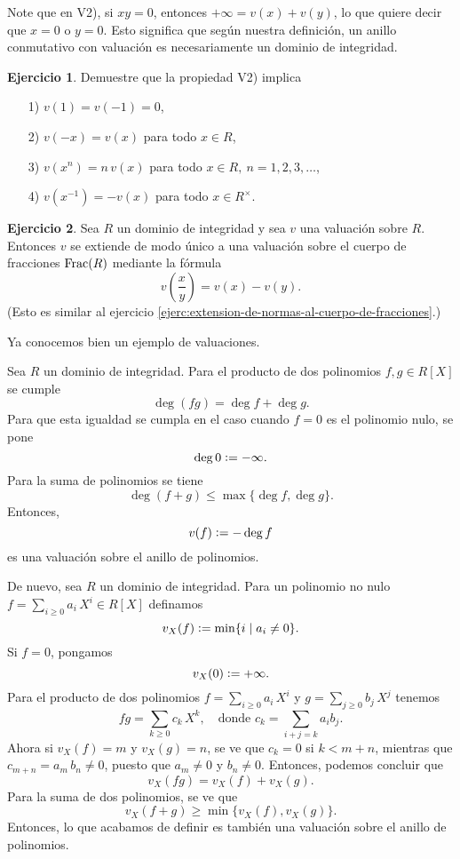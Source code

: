 \documentclass{article}
\numberwithin{equation}{section}
\theoremstyle{definition}
\newtheorem{ejerc}{Ejercicio}
\begin{document}
Note que en V2), si $xy = 0$, entonces $+\infty = v (x) + v (y)$, lo que quiere
decir que $x = 0$ o $y = 0$. Esto significa que según nuestra definición, un
anillo conmutativo con valuación es necesariamente un dominio de integridad.

\begin{ejerc}
  Demuestre que la propiedad V2) implica

  \begin{enumerate}
  \item[1)] $v (1) = v (-1) = 0$,

  \item[2)] $v (-x) = v (x)$ para todo $x\in R$,

  \item[3)] $v (x^n) = n\,v (x)$ para todo $x\in R, ~ n = 1,2,3,\ldots$,

  \item[4)] $v (x^{-1}) = -v(x)$ para todo $x\in R^\times$.
  \end{enumerate}
\end{ejerc}

\begin{ejerc}
  \label{ejerc:extension-de-valuaciones-al-cuerpo-de-fracciones}
  Sea $R$ un dominio de integridad y sea $v$ una valuación sobre $R$. Entonces
  $v$ se extiende de modo único a una valuación sobre el cuerpo de fracciones
  $\operatorname{Frac} (R)$ mediante la fórmula
  $$v \left(\frac{x}{y}\right) = v (x) - v (y).$$
  (Esto es similar al ejercicio
  \ref{ejerc:extension-de-normas-al-cuerpo-de-fracciones}.)
\end{ejerc}

Ya conocemos bien un ejemplo de valuaciones.

\begin{ejemplo}
  \label{ejemplo:valuacion-por-grado}
  Sea $R$ un dominio de integridad. Para el producto de dos polinomios
  $f,g\in R [X]$ se cumple
  $$\deg (fg) = \deg f + \deg g.$$
  Para que esta igualdad se cumpla en el caso cuando $f = 0$ es el polinomio
  nulo, se pone
  $$\deg 0 \mathrel{\mathop:}= -\infty.$$
  Para la suma de polinomios se tiene
  $$\deg (f+g) \le \max \{ \deg f, \deg g \}.$$
  Entonces,
  $$v (f) \mathrel{\mathop:}= -\deg f$$
  es una valuación sobre el anillo de polinomios.
\end{ejemplo}

\begin{ejemplo}
  \label{ejemplo:valuacion-por-X}
  De nuevo, sea $R$ un dominio de integridad. Para un polinomio no nulo
  $f = \sum_{i\ge 0} a_i\,X^i \in R [X]$ definamos
  $$v_X (f) \mathrel{\mathop:}= \min \{ i \mid a_i \ne 0 \}.$$
  Si $f = 0$, pongamos
  $$v_X (0) \mathrel{\mathop:}= +\infty.$$
  Para el producto de dos polinomios $f = \sum_{i\ge 0} a_i\,X^i$
  y $g = \sum_{j\ge 0} b_j\,X^j$ tenemos
  \[ fg = \sum_{k\ge 0} c_k\,X^k, \quad
     \text{donde }c_k = \sum_{i+j = k} a_i b_j. \]
  Ahora si $v_X (f) = m$ y $v_X (g) = n$, se ve que $c_k = 0$ si $k < m+n$,
  mientras que $c_{m+n} = a_m\,b_n \ne 0$, puesto que $a_m\ne 0$
  y $b_n\ne 0$. Entonces, podemos concluir que
  $$v_X (fg) = v_X (f) + v_X (g).$$
  Para la suma de dos polinomios, se ve que
  $$v_X (f+g) \ge \min \{ v_X (f), v_X (g) \}.$$
  Entonces, lo que acabamos de definir es también una valuación sobre el anillo
  de polinomios.
\end{ejemplo}
\end{document}

